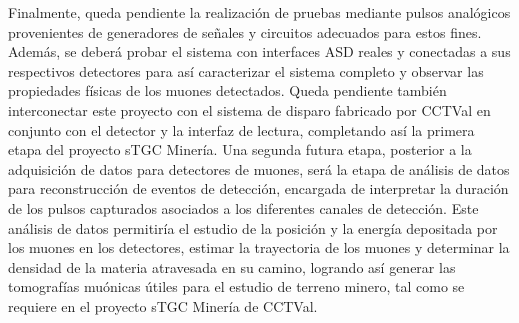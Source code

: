 Finalmente, queda pendiente la realización de pruebas mediante pulsos analógicos provenientes de generadores de señales y circuitos adecuados para estos fines. Además, se deberá probar el sistema con interfaces ASD reales y conectadas a sus respectivos detectores para así caracterizar el sistema completo y observar las propiedades físicas de los muones detectados. Queda pendiente también interconectar este proyecto con el sistema de disparo\cite{Oyanadel2020SistemaSTGC} fabricado por CCTVal en conjunto con el detector y la interfaz de lectura, completando así la primera etapa del proyecto sTGC Minería. Una segunda futura etapa, posterior a la adquisición de datos para detectores de muones, será la etapa de análisis de datos para reconstrucción de eventos de detección, encargada de interpretar la duración de los pulsos capturados asociados a los diferentes canales de detección. Este análisis de datos permitiría el estudio de la posición y la energía depositada por los muones en los detectores, estimar la trayectoria de los muones y determinar la densidad de la materia atravesada en su camino, logrando así generar las tomografías muónicas útiles para el estudio de terreno minero, tal como se requiere en el proyecto sTGC Minería de CCTVal.
